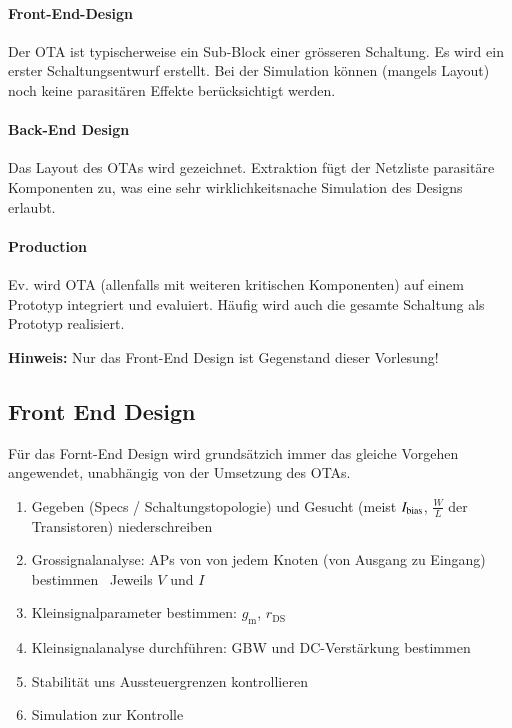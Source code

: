 \begin{minipage}[t]{0.38\columnwidth}
    \raggedright

    \paragraph{Front-End-Design}
    Der OTA ist typischerweise ein Sub-Block einer grösseren Schaltung.
    Es wird ein erster Schaltungsentwurf erstellt.
    Bei der Simulation können (mangels Layout) noch keine parasitären Effekte berücksichtigt werden.

    \medskip

    \paragraph{Back-End Design}
    Das Layout des OTAs wird gezeichnet. 
    Extraktion fügt der Netzliste parasitäre Komponenten zu, was eine sehr wirklichkeitsnache Simulation des Designs erlaubt.

    \medskip

    \paragraph{Production}
    Ev. wird OTA (allenfalls mit weiteren kritischen Komponenten) auf einem Prototyp integriert und evaluiert.
    Häufig wird auch die gesamte Schaltung als Prototyp realisiert. 

    \medskip

    \textbf{Hinweis:} Nur das Front-End Design ist Gegenstand dieser Vorlesung!
\end{minipage}

\columnbreak



\subsection{Front End Design}

Für das Fornt-End Design wird grundsätzich immer das gleiche Vorgehen angewendet, unabhängig von der Umsetzung des OTAs.

\smallskip

\begin{enumerate}
    \item Gegeben (Specs / Schaltungstopologie) und Gesucht (meist $I_{\rm bias}$, $\frac{W}{L}$ der Transistoren) niederschreiben
    \item Grossignalanalyse: APs von von jedem Knoten (von Ausgang zu Eingang) bestimmen \textrightarrow\ Jeweils $V$ und $I$
    \item Kleinsignalparameter bestimmen: $g_\text{m}$, $r_\text{DS}$
    \item Kleinsignalanalyse durchführen: GBW und DC-Verstärkung bestimmen
    \item Stabilität uns Aussteuergrenzen kontrollieren
    \item Simulation zur Kontrolle
\end{enumerate}


